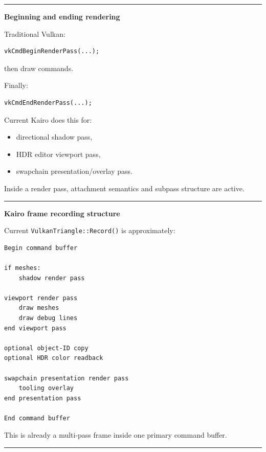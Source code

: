 \begin{center}\rule{0.5\linewidth}{0.5pt}\end{center}

\textbf{Beginning and ending rendering}

Traditional Vulkan:

\begin{verbatim}
vkCmdBeginRenderPass(...);
\end{verbatim}

then draw commands.

Finally:

\begin{verbatim}
vkCmdEndRenderPass(...);
\end{verbatim}

Current Kairo does this for:

\begin{itemize}
\tightlist
\item
  directional shadow pass,
\item
  HDR editor viewport pass,
\item
  swapchain presentation/overlay pass.
\end{itemize}

Inside a render pass, attachment semantics and subpass structure are active.

\begin{center}\rule{0.5\linewidth}{0.5pt}\end{center}

\textbf{Kairo frame recording structure}

Current \texttt{VulkanTriangle::Record()} is approximately:

\begin{verbatim}
Begin command buffer

if meshes:
    shadow render pass

viewport render pass
    draw meshes
    draw debug lines
end viewport pass

optional object-ID copy
optional HDR color readback

swapchain presentation render pass
    tooling overlay
end presentation pass

End command buffer
\end{verbatim}

This is already a multi-pass frame inside one primary command buffer.

\begin{center}\rule{0.5\linewidth}{0.5pt}\end{center}

